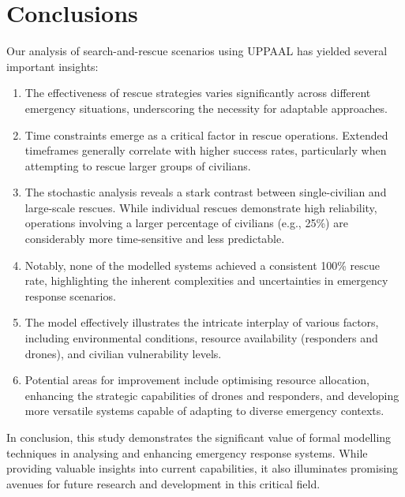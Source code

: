 
\section{Conclusions}
Our analysis of search-and-rescue scenarios using UPPAAL has yielded several important insights:

\begin{enumerate}
	\item The effectiveness of rescue strategies varies significantly across different emergency situations, underscoring the necessity for adaptable approaches.
	
	\item Time constraints emerge as a critical factor in rescue operations. Extended timeframes generally correlate with higher success rates, particularly when attempting to rescue larger groups of civilians.
	
	\item The stochastic analysis reveals a stark contrast between single-civilian and large-scale rescues. While individual rescues demonstrate high reliability, operations involving a larger percentage of civilians (e.g., 25\%) are considerably more time-sensitive and less predictable.
	
	\item Notably, none of the modelled systems achieved a consistent 100\% rescue rate, highlighting the inherent complexities and uncertainties in emergency response scenarios.
	
	\item The model effectively illustrates the intricate interplay of various factors, including environmental conditions, resource availability (responders and drones), and civilian vulnerability levels.
	
	\item Potential areas for improvement include optimising resource allocation, enhancing the strategic capabilities of drones and responders, and developing more versatile systems capable of adapting to diverse emergency contexts.
\end{enumerate}

In conclusion, this study demonstrates the significant value of formal modelling techniques in analysing and enhancing emergency response systems. While providing valuable insights into current capabilities, it also illuminates promising avenues for future research and development in this critical field.